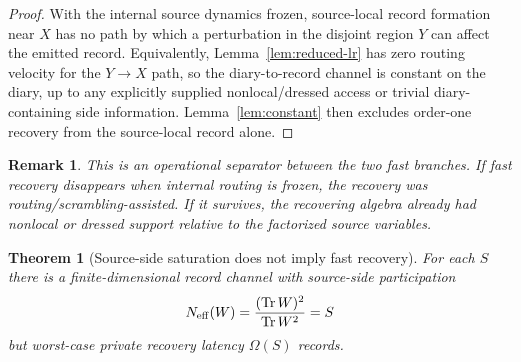 \documentclass[11pt]{article}
\newtheorem{theorem}{Theorem}
\newtheorem{remark}{Remark}
\newcommand{\Tr}{\operatorname{Tr}}
\begin{document}
\begin{proof}
With the internal source dynamics frozen, source-local record formation
near $X$ has no path by which a perturbation in the disjoint region $Y$
can affect the emitted record.  Equivalently, Lemma~\ref{lem:reduced-lr}
has zero routing velocity for the $Y\to X$ path, so the diary-to-record
channel is constant on the diary, up to any explicitly supplied
nonlocal/dressed access or trivial diary-containing side information.
Lemma~\ref{lem:constant} then excludes order-one recovery from the
source-local record alone.
\end{proof}

\begin{remark}
This is an operational separator between the two fast branches.  If
fast recovery disappears when internal routing is frozen, the recovery
was routing/scrambling-assisted.  If it survives, the recovering algebra
already had nonlocal or dressed support relative to the factorized
source variables.
\end{remark}

\begin{theorem}[Source-side saturation does not imply fast recovery]
\label{thm:saturation-slow}
For each $S$ there is a finite-dimensional record channel with
source-side participation
\begin{equation}
  N_{\rm eff}(W)
  =
  \frac{(\Tr W)^2}{\Tr W^2}
  =
  S
\end{equation}
but worst-case private recovery latency $\Omega(S)$ records.
\end{theorem}
\end{document}
